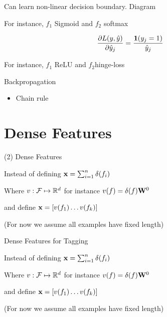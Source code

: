 \documentclass{beamer}
\begin{document}
\begin{frame}{}
  Can learn non-linear decision boundary. 
  Diagram
\end{frame}

\begin{frame}
  For instance, $f_1$ Sigmoid and $f_2$ softmax

  \[ \frac{\partial L(y, \hat{y})}{\partial \hat{y}_j} = \frac{\mathbf{1}(y_j = 1)} {\hat{y}_j}  \]

\end{frame}


\begin{frame}
  For instance, $f_1$ ReLU and $f_2 $hinge-loss

  
\end{frame}


\begin{frame}{Backpropagation} 
  \begin{itemize}
  \item Chain rule 
  \end{itemize}
\end{frame}

\section{Dense Features}
 
\begin{frame}{(2) Dense Features}
  
  Instead of defining $\mathbf{x} = \sum_{i=1}^n \delta(f_i)$ 


  Where $v : \mathcal{F} \mapsto \mathbb{R}^d$ for instance $v(f) = \delta(f) \mathbf{W}^0$ 

  and define  $\mathbf{x} = [ v(f_1) \ldots v(f_k)] $ 

  (For now we assume all examples have fixed length) 

\end{frame}

\begin{frame}{Dense Features for Tagging}
  
  Instead of defining $\mathbf{x} = \sum_{i=1}^n \delta(f_i)$ 


  Where $v : \mathcal{F} \mapsto \mathbb{R}^d$ for instance $v(f) = \delta(f) \mathbf{W}^0$ 

  and define  $\mathbf{x} = [ v(f_1) \ldots v(f_k)] $ 

  (For now we assume all examples have fixed length) 

\end{frame}
\end{document}
